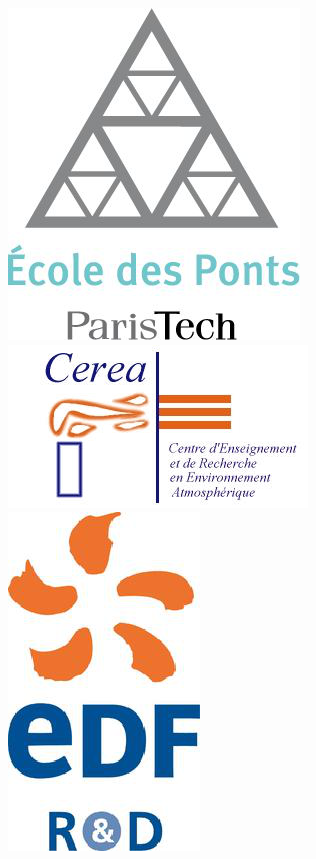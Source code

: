 
\titlepage

    \begin{figure}
        \begin{minipage}[c]{0.2\linewidth}
            \begin{center}
                \includegraphics[height=0.09\textheight]{./logos/enpc}
            \end{center}
        \end{minipage}
        \hfill
        \begin{minipage}[c]{0.2\linewidth}
            \begin{center}
                \includegraphics[height=0.09\textheight]{./logos/cerea}
            \end{center}
        \end{minipage}
        \hfill
        \begin{minipage}[c]{0.2\linewidth}
            \begin{center}
                \includegraphics[height=0.09\textheight]{./logos/edf}

\end{center}
\end{minipage}
\end{figure}
